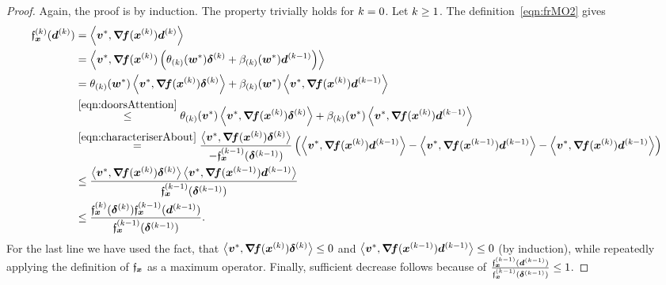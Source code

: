 \documentclass{article}
\theoremstyle{plain}
\theoremstyle{definition}
\newtheorem*{remark*}{Remark}
\begin{document}
\begin{proof}
	Again, the proof is by induction.
	The property trivially holds for $k=0$.
	Let $k \geq 1$.
	The definition~\eqref{eqn:frMO2}
	gives
	\begin{align*}
		\funcXK(\vdK)
		&=
		\mul{\ve{v}^*}{\jacf(\vxK) \vdK}
		\\
		&=
		\mul{\ve{v}^*}{\jacf(\vxK)
		\args{
			\theta\kK(\ve w^*)
			\sdK
			+
			\beta\kK(\ve w^*)
			\vdKp
		}}
		\\
		&=
		\theta\kK(\ve w^*)
		\mul{\ve{v}^*}{\jacf(\vxK)\sdK}
		+
		\beta\kK(\ve w^*)
		\mul{\ve{v}^*}{\jacf(\vxK)\vdKp}
		\\
		&\stackrel{\eqref{eqn:doorsAttention}}\leq
		\theta\kK(\ve v^*)
		\mul{\ve{v}^*}{\jacf(\vxK)\sdK}
		+
		\beta\kK(\ve v^*)
		\mul{\ve{v}^*}{\jacf(\vxK)\vdKp}
		\\
		&\stackrel{\eqref{eqn:characteriserAbout}}=
		\frac{
			\mul{\ve{v}^*}{\jacf(\vxK)\sdK}
		}{
			-\funcXKp(\sdKp)
		}
		\args{
		 		\mul{\ve v^*}{\jacf(\vxK)\vdKp}
				-
				\mul{\ve v^*}{
					\jacf(\vxKp)\vdKp
			}
			- 
			\mul{\ve{v}^*}{\jacf(\vxK)\vdKp}
		}
		\\
		&\leq
		\frac{
		\mul{\ve{v}^*}{\jacf(\vxK)\sdK}	
		\mul{\ve v^*}{\jacf(\vxKp)\vdKp}
		}{
		\funcXKp(\sdKp)
		}
		\\
		&\leq \frac{
			\funcXK(\sdK)
			\funcXKp(\vdKp)
		}{
			\funcXKp(\sdKp)
		}
		.
	\end{align*}
	For the last line we have used the fact, that 
	$\left\langle \bm{v}^*, \bm{\nabla}\!\bm{f}(\bm{x}^{(k)})\bm{\delta}^{(k)} \right\rangle \leq 0$ and 
	$\left\langle \bm{v}^*, \bm{\nabla}\!\bm{f}(\bm{x}^{(k-1)})\bm{d}^{(k-1)} \right\rangle \leq 0$ (by induction),
	while repeatedly applying the definition of $\mathfrak{f}_{\bm{x}}$ as a maximum operator.
	Finally, sufficient decrease follows
	because of $\frac{\mathfrak{f}_{\bm{x}}^{(k-1)}(\bm{d}^{(k-1)})}{\mathfrak{f}_{\bm{x}}^{(k-1)}(\bm{\delta}^{(k-1)})}\leq 1$.
\end{proof}

\end{document}
